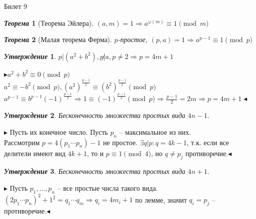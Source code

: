 \documentclass[a4paper,12pt]{article}
\newtheorem{teo}{\textit{Теорема}}
\newtheorem{utv}{\textit{Утверждение}}
\newcommand{\ee}{\equiv}
\newcommand{\FI}{\varphi}
\newcommand{\pb}{\blacktriangleright}
\newcommand{\pe}{\blacktriangleleft}
\newcommand{\Ra}{\Rightarrow}
\begin{document}
\begin{mybox}{\hypertarget{bil9}{Билет 9}}
\begin{teo}[Теорема Эйлера] $(a,m) = 1\Ra a^{\FI(m)} \ee 1\pmod{m}$
\end{teo}
\begin{teo}[Малая теорема Ферма] $p$-простое, $(p,a) = 1\Ra a^{p-1} \ee 1\pmod{p}$
\end{teo}
\begin{utv} $p|(a^2+b^2), p\not|a, p\not=2 \Ra p = 4m+1$
\end{utv}
$\pb a^2 + b^2 \ee 0\pmod{p}$\\
$a^2 \ee -b^2\pmod{p}, (a^2)^{\frac{p-1}{2}} \ee (b^2)^{\frac{p-1}{2}}\pmod{p}$\\
$a^{p-1}\ee b^{p-1} (-1)^{\frac{p-1}{2}} \Ra 1 \ee (-1)^{\frac{p-1}{2}}\pmod{p}\Ra \frac{p-1}{2} = 2m\Ra p = 4m+1\pe$
\begin{utv} Бесконечность множества простых вида $4n-1$.
\end{utv}
$\pb $ Пусть их конечное число. Пусть $p_n$ -- максимальное из них.\\
Рассмотрим $p = 4(p_1\cdots p_n) - 1$ не простое. $\exists q|p:q = 4k-1$, т.к. если все делители имеют вид $4k+1$, то и $p \ee 1 \pmod{4}$, но $q \not= p_j$ противоречие.$\pe$
\begin{utv} Бесконечность множества простых вида $4n+1$.
\end{utv}
$\pb $ Пусть $p_1,\dots,p_n$ -- все простые числа такого вида.\\
$(2p_1\cdots p_n)^2 + 1^2 = q_1\cdots q_m \Ra q_i = 4m_i+1$ по лемме, значит $q_i = p_j$ -- противоречие.$\pe$ 
\end{mybox}
\end{document}
